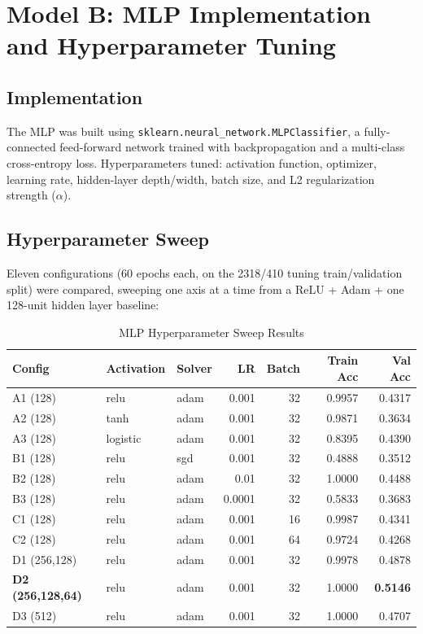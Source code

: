 \documentclass[12pt,a4paper]{article}
\begin{document}
\section{Model B: MLP Implementation and Hyperparameter Tuning}

\subsection{Implementation}
The MLP was built using \texttt{sklearn.neural\_network.MLPClassifier}, a fully-connected feed-forward
network trained with backpropagation and a multi-class cross-entropy loss. Hyperparameters tuned:
activation function, optimizer, learning rate, hidden-layer depth/width, batch size, and L2
regularization strength ($\alpha$).

\subsection{Hyperparameter Sweep}
Eleven configurations (60 epochs each, on the 2318/410 tuning train/validation split) were compared,
sweeping one axis at a time from a ReLU + Adam + one 128-unit hidden layer baseline:

\begin{table}[H]
\centering
\small
\caption{MLP Hyperparameter Sweep Results}
\begin{tabular}{lllrrrr}
\toprule
Config & Activation & Solver & LR & Batch & Train Acc & Val Acc \\
\midrule
A1 (128) & relu & adam & 0.001 & 32 & 0.9957 & 0.4317 \\
A2 (128) & tanh & adam & 0.001 & 32 & 0.9871 & 0.3634 \\
A3 (128) & logistic & adam & 0.001 & 32 & 0.8395 & 0.4390 \\
B1 (128) & relu & sgd & 0.001 & 32 & 0.4888 & 0.3512 \\
B2 (128) & relu & adam & 0.01 & 32 & 1.0000 & 0.4488 \\
B3 (128) & relu & adam & 0.0001 & 32 & 0.5833 & 0.3683 \\
C1 (128) & relu & adam & 0.001 & 16 & 0.9987 & 0.4341 \\
C2 (128) & relu & adam & 0.001 & 64 & 0.9724 & 0.4268 \\
D1 (256,128) & relu & adam & 0.001 & 32 & 0.9978 & 0.4878 \\
\textbf{D2 (256,128,64)} & relu & adam & 0.001 & 32 & 1.0000 & \textbf{0.5146} \\
D3 (512) & relu & adam & 0.001 & 32 & 1.0000 & 0.4707 \\
\bottomrule
\end{tabular}
\end{table}
\end{document}
